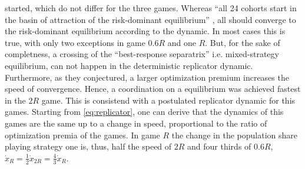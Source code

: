 started, which do not differ for the three games. 
Whereas ``all 24 cohorts start in the basin of attraction
of the risk-dominant equilibrium'' 
\parencite[755]{battalio_optimization_2001}, all should converge to the 
risk-dominant equilibrium according to the dynamic.
In most cases this is true, with only two exceptions in game $0.6R$ 
and one $R$.
But, for the sake of completness, a crossing of the  
``best-response separatrix'' \parencite{battalio_optimization_2001} i.e. 
mixed-strategy equilibrium, can not happen in the deterministic replicator 
dynamic. Furthermore, as they conjectured, a larger optimization premium 
increases the speed of convergence. Hence, a coordination on a equilibrium 
was achieved fastest in the $2R$ game. This is consistend with a 
postulated replicator dynamic for this games. Starting from 
\eqref{eq:replicator}, one can derive that the dynamics of this 
games are the same up to a change in speed, proportional to the ratio of 
optimization premia of the games. In game $R$ the change in the population share
playing strategy one is, thus, half the speed of $2R$ and four thirds of $0.6R$,
$\dot{x}_{R} = \frac 12 \dot{x}_{2R} = \frac{4}{3}\dot{x}_R$.

